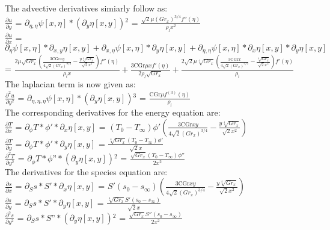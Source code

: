 	\noindent The advective derivatives simiarly follow as:\\ 
	$\frac{\partial u}{\partial y}$ = $\partial _{\eta ,\eta }\psi [x,\eta ]*\left(\partial _y\eta [x,y]\right){}^2$ = $\frac{\sqrt{2} \mu  \left(Gr_x\right)^{3/4} f''(\eta )}{\rho_l x^2}$\\
	$\frac{\partial u}{\partial x}$ = $\partial _{\eta }\psi [x,\eta ]*\partial _{x,y}\eta [x,y]+\partial _{x,\eta }\psi [x,\eta ]*\partial _y\eta [x,y]+\partial
	_{\eta ,\eta }\psi [x,\eta ]*\partial _x\eta [x,y]*\partial _y\eta [x,y]$ =  $\frac{2 \mu  \sqrt{Gr_x} \left(\frac{3 \text{CGr} x y}{4 \sqrt{2} \left(Gr_x\right)^{3/4}}-\frac{y \sqrt[4]{Gr_x}}{\sqrt{2} x^2}\right) f''(\eta )}{\rho_l x}+\frac{3 \text{CGr} \mu  x f'(\eta )}{2 \rho_l \sqrt{Gr_x}}+\frac{2 \sqrt{2}\mu  \sqrt[4]{Gr_x} \left(\frac{3 \text{CGr} x}{4 \sqrt{2} \left(Gr_x\right)^{3/4}}-\frac{\sqrt[4]{Gr_x}}{\sqrt{2} x^2}\right) f'(\eta )}{\rho_l}$ \\

	\noindent The laplacian term is now given as:\\
	$\frac{\partial^2 u}{\partial y^2}$ = $\partial _{\eta ,\eta ,\eta }\psi [x,\eta ]*\left(\partial _y\eta [x,y]\right){}^3$ = $\frac{\text{CGr} \mu  f^{(3)}(\eta )}{\rho_l}$\\

	\noindent The corresponding derivatives for the energy equation are:\\
	$\frac{\partial T}{\partial x}$ = $\partial _{\phi }T*\phi '*\partial _x\eta [x,y]$ = 
	$(T_0-T_\infty) \phi ' \left(\frac{3 \text{CGr} x y}{4 \sqrt{2} \left(Gr_x\right)^{3/4}}-\frac{y \sqrt[4]{Gr_x}}{\sqrt{2} x^2}\right)$\\
	$\frac{\partial T}{\partial y}$ = $ \partial _{\phi }T*\phi '*\partial _y\eta [x,y]$ = $\frac{\sqrt[4]{Gr_x} (T_0-T_\infty) \phi '}{\sqrt{2} x}$\\
	$\frac{\partial^2 T}{\partial y^2}$ = $\partial _{\phi }T*\phi \text{''}*\left(\partial _y\eta [x,y]\right){}^2$ = $\frac{\sqrt{Gr_x} (T_0-T_\infty) \phi ''}{2 x^2}$\\

	\noindent The derivatives for the species equation are:\\
	$\frac{\partial s}{\partial x}$ = $\partial _Ss * S'*\partial _x\eta [x,y]$ = $S' (s_0-s_\infty) \left(\frac{3 \text{CGr} x y}{4 \sqrt{2} \left(Gr_x\right)^{3/4}}-\frac{y \sqrt[4]{Gr_x}}{\sqrt{2} x^2}\right)$\\
	$\frac{\partial s}{\partial y}$ = $\partial _Ss * S'*\partial _y\eta [x,y]$ = $\frac{\sqrt[4]{Gr_x} S' (s_0-s_\infty)}{\sqrt{2} x}$\\
	$\frac{\partial^2 s}{\partial y^2}$ = $\partial _Ss* S\text{''}*\left(\partial _y\eta [x,y]\right){}^2$ = $\frac{\sqrt{Gr_x} S'' (s_0-s_\infty)}{2 x^2}$\\

